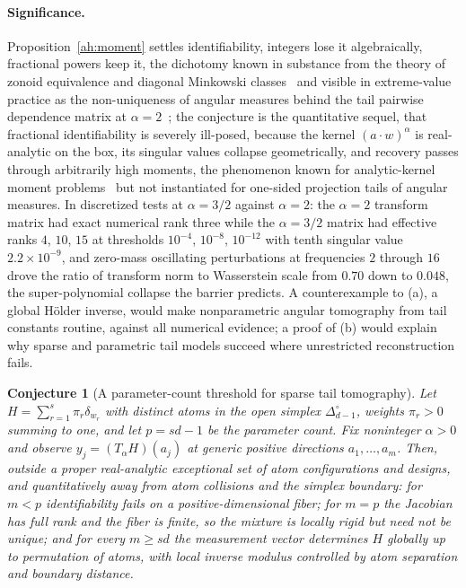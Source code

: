\documentclass[11pt]{article}
\newtheorem{conjecture}{Conjecture}
\theoremstyle{definition}
\begin{document}
\paragraph{Significance.}
Proposition~\ref{ah:moment} settles identifiability, integers lose it algebraically, fractional powers keep it, the dichotomy known in substance from the theory of zonoid equivalence and diagonal Minkowski classes~\cite{MN21} and visible in extreme-value practice as the non-uniqueness of angular measures behind the tail pairwise dependence matrix at $\alpha=2$~\cite{CT19}; the conjecture is the quantitative sequel, that fractional identifiability is severely ill-posed, because the kernel $(a\cdot w)^\alpha$ is real-analytic on the box, its singular values collapse geometrically, and recovery passes through arbitrarily high moments, the phenomenon known for analytic-kernel moment problems~\cite{Tal87} but not instantiated for one-sided projection tails of angular measures.  In discretized tests at $\alpha=3/2$ against $\alpha=2$: the $\alpha=2$ transform matrix had exact numerical rank three while the $\alpha=3/2$ matrix had effective ranks $4$, $10$, $15$ at thresholds $10^{-4}$, $10^{-8}$, $10^{-12}$ with tenth singular value $2.2\times10^{-9}$, and zero-mass oscillating perturbations at frequencies $2$ through $16$ drove the ratio of transform norm to Wasserstein scale from $0.70$ down to $0.048$, the super-polynomial collapse the barrier predicts.  A counterexample to (a), a global H\"older inverse, would make nonparametric angular tomography from tail constants routine, against all numerical evidence; a proof of (b) would explain why sparse and parametric tail models succeed where unrestricted reconstruction fails.

\begin{conjecture}[A parameter-count threshold for sparse tail tomography]\label{ah10}
Let $H=\sum_{r=1}^s\pi_r\delta_{w_r}$ with distinct atoms in the open simplex $\Delta_{d-1}^\circ$, weights $\pi_r>0$ summing to one, and let $p=sd-1$ be the parameter count.  Fix noninteger $\alpha>0$ and observe $y_j=(T_\alpha H)(a_j)$ at generic positive directions $a_1,\ldots,a_m$.  Then, outside a proper real-analytic exceptional set of atom configurations and designs, and quantitatively away from atom collisions and the simplex boundary: for $m<p$ identifiability fails on a positive-dimensional fiber; for $m=p$ the Jacobian has full rank and the fiber is finite, so the mixture is locally rigid but need not be unique; and for every $m\ge sd$ the measurement vector determines $H$ globally up to permutation of atoms, with local inverse modulus controlled by atom separation and boundary distance.
\end{conjecture}
\end{document}
